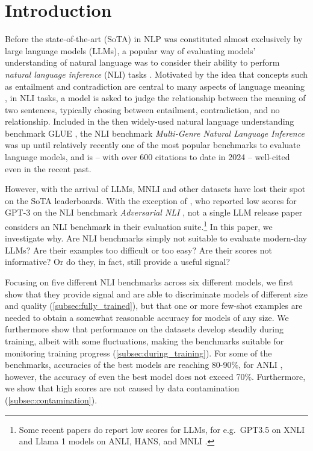 \section{Introduction}

Before the state-of-the-art (SoTA) in NLP was constituted almost exclusively by large language models (LLMs), a popular way of evaluating models' understanding of natural language was to consider their ability to perform \emph{natural language inference} (NLI) tasks \citep[most famously,][]{bowman-etal-2015-large,williams-etal-2018-broad}.
Motivated by the idea that concepts such as entailment and contradiction are central to many aspects of language meaning \citep{bowman-etal-2015-large}, in NLI tasks, a model is asked to judge the relationship between the meaning of two sentences, typically chosing between entailment, contradiction, and no relationship.
Included in the then widely-used natural language understanding benchmark GLUE \citep{wang2019glue}, the NLI benchmark \emph{Multi-Genre Natural Language Inference}  \citep[MNLI,][]{williams-etal-2018-broad} was up until relatively recently one of the most popular benchmarks to evaluate language models, and is -- with over 600 citations to date in 2024 -- well-cited even in the recent past.

However, with the arrival of LLMs, MNLI and other datasets have lost their spot on the SoTA leaderboards.
With the exception of \citet{brown2020language},  who reported low scores for GPT-3 on the NLI benchmark \emph{Adversarial NLI} \citep[ANLI,][]{nie-etal-2020-adversarial}, not a single LLM release paper considers an NLI benchmark in their evaluation suite.\footnote{Some recent papers do report low scores for LLMs, for e.g.\ GPT3.5 on XNLI \citep{ohmer2024form,ohmer-etal-2023-separating} and Llama 1 models on ANLI, HANS, and MNLI \citep{mccoy-etal-2019-right,weber-etal-2023-mind}.}
In this paper, we investigate why.
Are NLI benchmarks simply not suitable to evaluate modern-day LLMs? 
Are their examples too difficult or too easy?
Are their scores not informative?
Or do they, in fact, still provide a useful signal?

Focusing on five different NLI benchmarks across six different models, we first show that they provide signal and are able to discriminate models of different size and quality (\cref{subsec:fully_trained}), but that one or more few-shot examples are needed to obtain a somewhat reasonable accuracy for models of any size.
We furthermore show that performance on the datasets develop steadily during training, albeit with some fluctuations, making the benchmarks suitable for monitoring training progress (\cref{subsec:during_training}).
For some of the benchmarks, accuracies of the best models are reaching 80-90\%, for ANLI \citep{nie-etal-2020-adversarial}, however, the accuracy of even the best model does not exceed 70\%.
Furthermore, we show that high scores are not caused by data contamination (\cref{subsec:contamination}).

